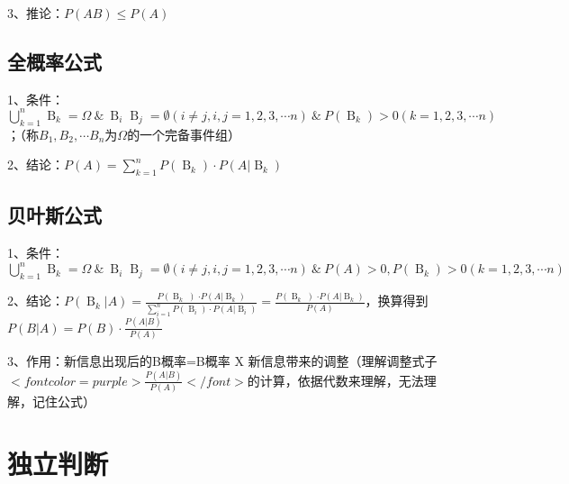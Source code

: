 3、推论：$ P(AB) \le P(A) $



\subsection{全概率公式}

1、条件：$ \mathop{ \bigcup }\limits_{{k=1}}^{{n}}\mathop{{B}}\nolimits_{{k}}=\Omega \ \& \ \mathop{{B}}\nolimits_{{i}}\mathop{{B}}\nolimits_{{j}}= \emptyset { \left( {i \neq j,i,j=1,2,3, \cdots n} \right) } \ \& \ P{ \left( {\mathop{{B}}\nolimits_{{k}}} \right) } > 0{ \left( {k=1,2,3, \cdots n} \right) } $；（称$ B_1,B_2,\cdots B_n $为$ \Omega $的一个完备事件组）

2、结论：$ P{ \left( {A} \right) }=\mathop{ \sum }\limits_{{k=1}}^{{n}}P{ \left( {\mathop{{B}}\nolimits_{{k}}} \right) } \cdot P{ \left( {A \left| \mathop{{B}}\nolimits_{{k}}\right. } \right) } $



\subsection{贝叶斯公式}

1、条件：$ \mathop{ \bigcup }\limits_{{k=1}}^{{n}}\mathop{{B}}\nolimits_{{k}}=\Omega \ \& \ \mathop{{B}}\nolimits_{{i}}\mathop{{B}}\nolimits_{{j}}= \emptyset { \left( {i \neq j,i,j=1,2,3, \cdots n} \right) } \ \& \ P(A) > 0,P{ \left( {\mathop{{B}}\nolimits_{{k}}} \right) } > 0{ \left( {k=1,2,3, \cdots n} \right) } $

2、结论：$ P{ \left( {\mathop{{B}}\nolimits_{{k}} \left| A\right. } \right) }=\frac{{P \left( {\mathop{{B}}\nolimits_{{k}}} \left) \cdot P{ \left( {A \left| {\mathop{{B}}\nolimits_{{k}}}\right. } \right) }\right. \right. }}{{\mathop{ \sum }\limits_{{i=1}}^{{n}}P{ \left( {\mathop{{B}}\nolimits_{{i}}} \right) } \cdot P{ \left( {A \left| \mathop{{B}}\nolimits_{{i}}\right. } \right) }}}=\frac{{P \left( {\mathop{{B}}\nolimits_{{k}}} \left) \cdot P{ \left( {A \left| {\mathop{{B}}\nolimits_{{k}}}\right. } \right) }\right. \right. }}{P(A)} $，换算得到$ P(B|A)=P(B)\cdot \frac{P(A|B)}{P(A)} $

3、作用：新信息出现后的B概率=B概率 X 新信息带来的调整（理解调整式子$ <font color=purple>\frac{P(A|B)}{P(A)}</font> $的计算，依据代数来理解，无法理解，记住公式）

\section{独立判断}

